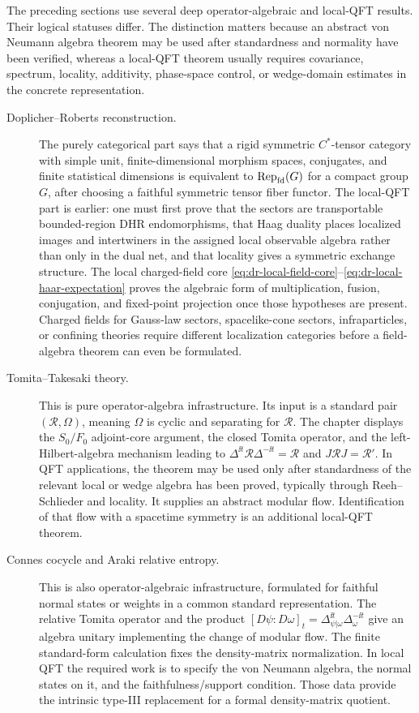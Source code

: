 The preceding sections use several deep operator-algebraic and local-QFT
results.  Their logical statuses differ.  The distinction matters because an
abstract von Neumann algebra theorem may be used after standardness and
normality have been verified, whereas a local-QFT theorem usually requires
covariance, spectrum, locality, additivity, phase-space control, or
wedge-domain estimates in the concrete representation.

\begin{description}
\item[Doplicher--Roberts reconstruction.]
The purely categorical part says that a rigid symmetric \(C^*\)-tensor
category with simple unit, finite-dimensional morphism spaces, conjugates, and
finite statistical dimensions is equivalent to
\({\rm Rep}_{\rm fd}(G)\) for a compact group \(G\), after choosing a faithful
symmetric tensor fiber functor.  The local-QFT part is earlier: one must first
prove that the sectors are transportable bounded-region DHR endomorphisms,
that Haag duality places localized images and intertwiners in the assigned
local observable algebra rather than only in the dual net, and that locality
gives a symmetric exchange structure.  The local charged-field core
\eqref{eq:dr-local-field-core}--\eqref{eq:dr-local-haar-expectation} proves
the algebraic form of multiplication, fusion, conjugation, and fixed-point
projection once those hypotheses are present.  Charged fields for Gauss-law
sectors, spacelike-cone sectors, infraparticles, or confining theories require
different localization categories before a field-algebra theorem can even be
formulated.

\item[Tomita--Takesaki theory.]
This is pure operator-algebra infrastructure.  Its input is a standard pair
\((\mathcal R,\Omega)\), meaning \(\Omega\) is cyclic and separating for
\(\mathcal R\).  The chapter displays the \(S_0/F_0\) adjoint-core argument,
the closed Tomita operator, and the left-Hilbert-algebra mechanism leading to
\(\Delta^{\ii t}\mathcal R\Delta^{-\ii t}=\mathcal R\) and
\(J\mathcal R J=\mathcal R'\).  In QFT applications, the theorem may be used
only after standardness of the relevant local or wedge algebra has been
proved, typically through Reeh--Schlieder and locality.  It supplies an
abstract modular flow.  Identification of that flow with a spacetime symmetry
is an additional local-QFT theorem.

\item[Connes cocycle and Araki relative entropy.]
This is also operator-algebraic infrastructure, formulated for faithful normal
states or weights in a common standard representation.  The relative Tomita
operator and the product
\([D\psi:D\omega]_t=\Delta_{\psi|\omega}^{\ii t}\Delta_\omega^{-\ii t}\)
give an algebra unitary implementing the change of modular flow.  The finite
standard-form calculation fixes the density-matrix normalization.  In local
QFT the required work is to specify the von Neumann algebra, the normal states
on it, and the faithfulness/support condition.  Those data provide the
intrinsic type-III replacement for a formal density-matrix quotient.


\end{description}
